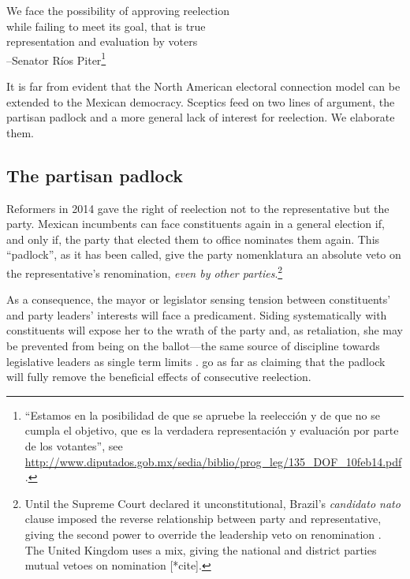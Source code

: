 \documentclass[letter,12pt]{article}
\begin{document}
\begin{center}
\begin{singlespacing}
  We face the possibility of approving reelection \\
  while failing to meet its goal, that is true \\
  representation and evaluation by voters \\
  --Senator Ríos Piter\footnote{``Estamos en la posibilidad de que se apruebe la reelección y de que no se cumpla el objetivo, que es la verdadera representación y evaluación por parte de los votantes'', see \url{http://www.diputados.gob.mx/sedia/biblio/prog_leg/135_DOF_10feb14.pdf}.}
\end{singlespacing}
\end{center}

\noindent It is far from evident that the North American electoral connection model can be extended to the Mexican democracy. Sceptics feed on two lines of argument, the partisan padlock and a more general lack of interest for reelection. We elaborate them. 

\subsection{The partisan padlock}

\noindent Reformers in 2014 gave the right of reelection not to the representative but the party. Mexican incumbents can face constituents again in a general election if, and only if, the party that elected them to office nominates them again. This ``padlock'', as it has been called, give the party nomenklatura an absolute veto on the representative's renomination, \emph{even by other parties}.\footnote{Until the Supreme Court declared it unconstitutional, Brazil's \emph{candidato nato} clause imposed the reverse relationship between party and representative, giving the second power to override the leadership veto on renomination \citep{mainwaring.1991}. The United Kingdom uses a mix, giving the national and district parties mutual vetoes on nomination [*cite].}

As a consequence, the mayor or legislator sensing tension between constituents' and party leaders' interests will face a predicament. Siding systematically with constituents will expose her to the wrath of the party and, as retaliation, she may be prevented from being on the ballot---the same source of discipline towards legislative leaders as single term limits \citep{weldon.1997}. \citet{merinoFierroZarkin2013Blog} go as far as claiming that the padlock will fully remove the beneficial effects of consecutive reelection. 
\end{document}
